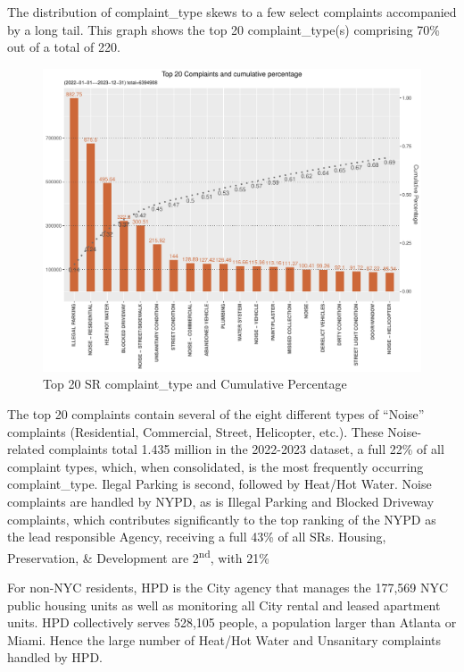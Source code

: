 \documentclass[12pt, titlepage]{article}
\begin{document}
The distribution of complaint\_type skews to a few select complaints accompanied by a long tail.
This graph shows the top 20 complaint\_type(s) comprising 70\% out of a total of 220.

\begin{figure}[H]
  \centering
	  \includegraphics[width=\textwidth]{SR_by_Complaint_Type.pdf}
	  \caption{Top 20 SR complaint\_type and Cumulative Percentage}
	  \label{fig:SR_complaints}
\end{figure}

The top 20 complaints contain several of the eight different types of ``Noise'' complaints (Residential, Commercial, Street, Helicopter, etc.). These Noise-related
complaints total 1.435 million in the 2022-2023 dataset, a full 22\% of all complaint types, which, when consolidated, is the most frequently occurring complaint\_type.
Ilegal Parking is second, followed by Heat/Hot Water. Noise complaints are handled by NYPD, as is Illegal Parking and Blocked Driveway complaints, which contributes
significantly to the top ranking of the NYPD as the lead responsible Agency, receiving a full 43\% of all SRs. 
Housing, Preservation, \& Development are 2\textsuperscript{nd}, with 21\%

For  non-NYC residents, HPD is the City agency that manages the 177,569 NYC public housing units as well as monitoring
all City rental and leased apartment units. HPD collectively serves 528,105 people, a population larger than Atlanta or Miami. 
Hence the large number of Heat/Hot Water and Unsanitary complaints handled by HPD. 
\end{document}
